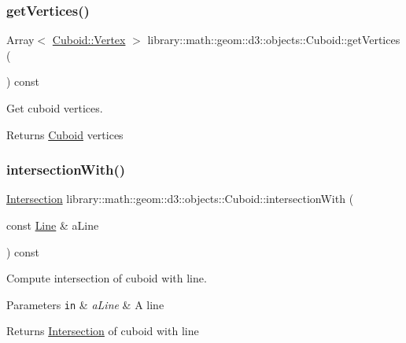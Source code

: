 \subsubsection{\texorpdfstring{get\+Vertices()}{getVertices()}}
{\footnotesize\ttfamily Array$<$ \hyperlink{classlibrary_1_1math_1_1geom_1_1d3_1_1objects_1_1_cuboid_ad9600791c8ac7f1253dc94417ec12f3c}{Cuboid\+::\+Vertex} $>$ library\+::math\+::geom\+::d3\+::objects\+::\+Cuboid\+::get\+Vertices (\begin{DoxyParamCaption}{ }\end{DoxyParamCaption}) const}



Get cuboid vertices. 

\begin{DoxyReturn}{Returns}
\hyperlink{classlibrary_1_1math_1_1geom_1_1d3_1_1objects_1_1_cuboid}{Cuboid} vertices 
\end{DoxyReturn}
\mbox{\label{classlibrary_1_1math_1_1geom_1_1d3_1_1objects_1_1_cuboid_a1f347ffdf70cb64bdbf236abd089715c}} 
\subsubsection{\texorpdfstring{intersection\+With()}{intersectionWith()}\hspace{0.1cm}{\footnotesize\ttfamily [1/5]}}
{\footnotesize\ttfamily \hyperlink{classlibrary_1_1math_1_1geom_1_1d3_1_1_intersection}{Intersection} library\+::math\+::geom\+::d3\+::objects\+::\+Cuboid\+::intersection\+With (\begin{DoxyParamCaption}\item[{const \hyperlink{classlibrary_1_1math_1_1geom_1_1d3_1_1objects_1_1_line}{Line} \&}]{a\+Line }\end{DoxyParamCaption}) const}



Compute intersection of cuboid with line. 


\begin{DoxyParams}[1]{Parameters}
\mbox{\tt in}  & {\em a\+Line} & A line \\
\hline
\end{DoxyParams}
\begin{DoxyReturn}{Returns}
\hyperlink{classlibrary_1_1math_1_1geom_1_1d3_1_1_intersection}{Intersection} of cuboid with line 
\end{DoxyReturn}
\mbox{\label{classlibrary_1_1math_1_1geom_1_1d3_1_1objects_1_1_cuboid_aa503c32d68da8de1f45eefd77cbd6a24}} 
